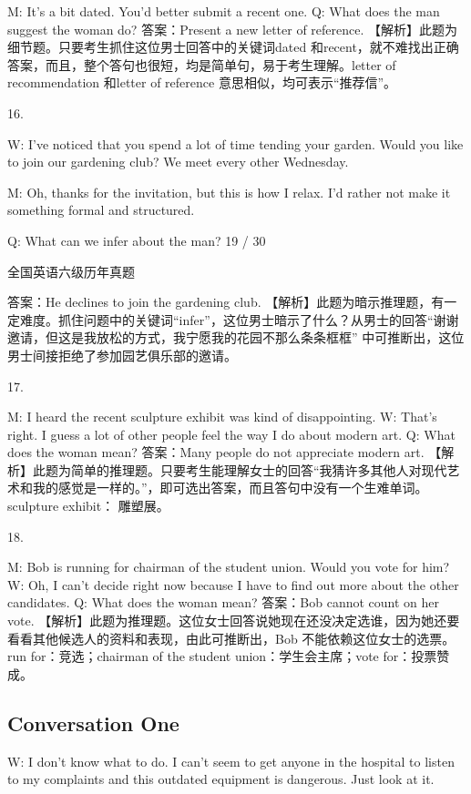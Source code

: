 \documentclass[UTF8,11pt]{ctexart}
\begin{document}
M: It’s a bit dated. You’d better submit a recent one. Q: What does the man suggest the woman do? 答案：Present a new letter of reference. 【解析】此题为细节题。只要考生抓住这位男士回答中的关键词dated 和recent，就不难找出正确答案，而且，整个答句也很短，均是简单句，易于考生理解。letter of recommendation 和letter of reference 意思相似，均可表示“推荐信”。


16.


W: I’ve noticed that you spend a lot of time tending your garden. Would you like to join our gardening club? We meet every other Wednesday.


M: Oh, thanks for the invitation, but this is how I relax. I’d rather not make it something formal and structured.


Q: What can we infer about the man? 19 / 30


全国英语六级历年真题


答案：He declines to join the gardening club. 【解析】此题为暗示推理题，有一定难度。抓住问题中的关键词“infer”，这位男士暗示了什么？从男士的回答“谢谢邀请，但这是我放松的方式，我宁愿我的花园不那么条条框框” 中可推断出，这位男士间接拒绝了参加园艺俱乐部的邀请。


17.


M: I heard the recent sculpture exhibit was kind of disappointing. W: That’s right. I guess a lot of other people feel the way I do about modern art. Q: What does the woman mean? 答案：Many people do not appreciate modern art. 【解析】此题为简单的推理题。只要考生能理解女士的回答“我猜许多其他人对现代艺术和我的感觉是一样的。”，即可选出答案，而且答句中没有一个生难单词。sculpture exhibit： 雕塑展。


18.


M: Bob is running for chairman of the student union. Would you vote for him? W: Oh, I can’t decide right now because I have to find out more about the other candidates. Q: What does the woman mean? 答案：Bob cannot count on her vote. 【解析】此题为推理题。这位女士回答说她现在还没决定选谁，因为她还要看看其他候选人的资料和表现，由此可推断出，Bob 不能依赖这位女士的选票。run for：竞选；chairman of the student union：学生会主席；vote for：投票赞成。


\subsection*{Conversation One}


W: I don’t know what to do. I can’t seem to get anyone in the hospital to listen to my complaints and this outdated equipment is dangerous. Just look at it.
\end{document}
